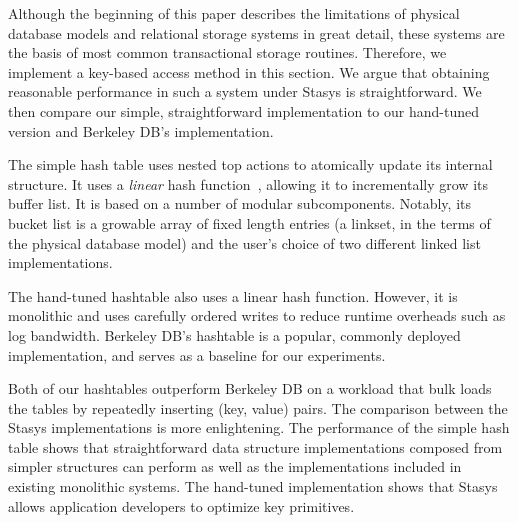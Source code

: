 \documentclass[letterpaper,twocolumn,10pt]{article}
\newcommand{\yad}{Stasys\xspace}
\begin{document}
Although the beginning of this paper describes the limitations of
physical database models and relational storage systems in great
detail, these systems are the basis of most common transactional
storage routines.  Therefore, we implement a key-based access 
method in this section. We argue that 
obtaining reasonable performance in such a system under \yad is
straightforward.  We then compare our simple, straightforward 
implementation to our hand-tuned version and Berkeley DB's implementation.

The simple hash table uses nested top actions to atomically update its
internal structure.  It uses a {\em linear} hash function~\cite{lht}, allowing
it to incrementally grow its buffer list.  It is based on a number of
modular subcomponents.  Notably, its bucket list is a growable array
of fixed length entries (a linkset, in the terms of the physical
database model) and the user's choice of two different linked list
implementations.

The hand-tuned hashtable also uses a linear hash
function.  However, it is monolithic and uses carefully ordered writes to
reduce runtime overheads such as log bandwidth.  Berkeley DB's
hashtable is a popular, commonly deployed implementation, and serves
as a baseline for our experiments.

Both of our hashtables outperform Berkeley DB on a workload that
bulk loads the tables by repeatedly inserting (key, value) pairs.
The comparison between the \yad  implementations is more
enlightening.  The performance of the simple hash table shows that
straightforward data structure implementations composed from
simpler structures can perform as well as the implementations included 
in existing monolithic systems.  The hand-tuned
implementation shows that \yad allows application developers to
optimize key primitives.


\end{document}
